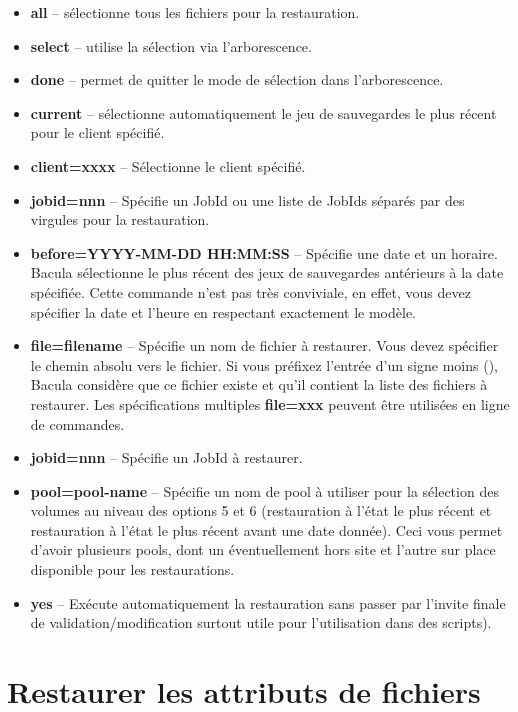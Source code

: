 \begin{itemize}
\item {\bf all} -- s\'electionne tous les fichiers pour la restauration.
\item {\bf select} -- utilise la s\'election via l'arborescence.
\item {\bf done} -- permet de quitter le mode de s\'election dans l'arborescence.
\item {\bf current} -- s\'electionne automatiquement le jeu de sauvegardes le plus 
   r\'ecent pour le client sp\'ecifi\'e.
\item {\bf client=xxxx} -- S\'electionne le client sp\'ecifi\'e.  
\item {\bf jobid=nnn} -- Sp\'ecifie un JobId ou une liste de JobIds s\'epar\'es par des 
   virgules pour la restauration.
\item {\bf before=YYYY-MM-DD HH:MM:SS} -- Sp\'ecifie une date et un horaire. Bacula 
   s\'electionne le plus r\'ecent des jeux de sauvegardes ant\'erieurs \`a la date sp\'ecifi\'ee.
   Cette commande n'est pas tr\`es conviviale, en effet, vous devez sp\'ecifier la date 
   et l'heure en respectant exactement le mod\`ele.
\item {\bf file=filename} -- Sp\'ecifie un nom de fichier \`a restaurer. Vous devez 
   sp\'ecifier le chemin absolu vers le fichier. Si vous pr\'efixez l'entr\'ee d'un signe moins 
   (\lt{}), Bacula consid\`ere que ce fichier existe et qu'il contient la liste des 
   fichiers \`a restaurer. Les sp\'ecifications multiples {\bf file=xxx} peuvent \^etre 
   utilis\'ees en ligne de commandes.
\item {\bf jobid=nnn} -- Sp\'ecifie un JobId \`a restaurer. 
\item {\bf pool=pool-name} -- Sp\'ecifie un nom de pool \`a utiliser pour la s\'election des 
   volumes au niveau des options 5 et 6 (restauration \`a l'\'etat le plus r\'ecent et 
   restauration \`a l'\'etat le plus r\'ecent avant une date donn\'ee). Ceci vous permet d'avoir 
   plusieurs pools, dont un \'eventuellement hors site et l'autre sur place disponible pour 
   les restaurations.
\item {\bf yes} -- Ex\'ecute automatiquement la restauration sans passer par l'invite finale 
   de validation/modification surtout utile pour l'utilisation dans des scripts). 
   \end{itemize}

\section{Restaurer les attributs de fichiers}


